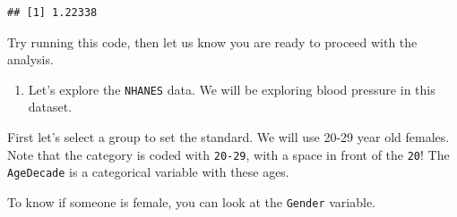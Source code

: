 \documentclass[
]{article}
\newenvironment{Shaded}{\begin{snugshade}}{\end{snugshade}}
\newcommand{\CommentTok}[1]{\textcolor[rgb]{0.56,0.35,0.01}{\textit{#1}}}
\newcommand{\KeywordTok}[1]{\textcolor[rgb]{0.13,0.29,0.53}{\textbf{#1}}}
\newcommand{\NormalTok}[1]{#1}
\newcommand{\OperatorTok}[1]{\textcolor[rgb]{0.81,0.36,0.00}{\textbf{#1}}}
\newcommand{\StringTok}[1]{\textcolor[rgb]{0.31,0.60,0.02}{#1}}
\providecommand{\tightlist}{%
  \setlength{\itemsep}{0pt}\setlength{\parskip}{0pt}}
\begin{document}
\begin{verbatim}
## [1] 1.22338
\end{verbatim}

Try running this code, then let us know you are ready to proceed with
the analysis.

\begin{enumerate}
\def\labelenumi{\arabic{enumi}.}
\tightlist
\item
  Let's explore the \texttt{NHANES} data. We will be exploring blood
  pressure in this dataset.
\end{enumerate}

First let's select a group to set the standard. We will use 20-29 year
old females. Note that the category is coded with \texttt{20-29}, with a
space in front of the \texttt{20}! The \texttt{AgeDecade} is a
categorical variable with these ages.

To know if someone is female, you can look at the \texttt{Gender}
variable.

\begin{Shaded}
\end{Shaded}
\end{document}
